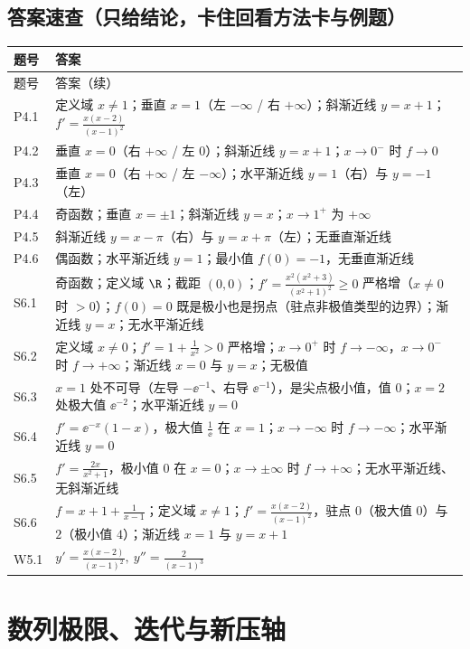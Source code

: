 \documentclass[11pt,a4paper]{ctexart}
\begin{document}
\subsection{答案速查（只给结论，卡住回看方法卡与例题）}
{\footnotesize
\begin{longtable}{@{}p{1.6cm}p{13.0cm}@{}}
\toprule 题号 & 答案 \\ \midrule
\endfirsthead
\toprule 题号 & 答案（续） \\ \midrule
\endhead
\midrule
\endfoot
\bottomrule
\endlastfoot
P4.1 & 定义域 $x\neq1$；垂直 $x=1$（左 $-\infty$ / 右 $+\infty$）；斜渐近线 $y=x+1$；$f'=\frac{x(x-2)}{(x-1)^{2}}$ \\
P4.2 & 垂直 $x=0$（右 $+\infty$ / 左 $0$）；斜渐近线 $y=x+1$；$x\to0^{-}$ 时 $f\to 0$ \\
P4.3 & 垂直 $x=0$（右 $+\infty$ / 左 $-\infty$）；水平渐近线 $y=1$（右）与 $y=-1$（左） \\
P4.4 & 奇函数；垂直 $x=\pm1$；斜渐近线 $y=x$；$x\to1^{+}$ 为 $+\infty$ \\
P4.5 & 斜渐近线 $y=x-\pi$（右）与 $y=x+\pi$（左）；无垂直渐近线 \\
P4.6 & 偶函数；水平渐近线 $y=1$；最小值 $f(0)=-1$，无垂直渐近线 \\
S6.1 & 奇函数；定义域 $\R$；截距 $(0,0)$；$f'=\frac{x^{2}(x^{2}+3)}{(x^{2}+1)^{2}}\geq0$ 严格增（$x\neq0$ 时 $>0$）；$f(0)=0$ 既是极小也是拐点（驻点非极值类型的边界）；渐近线 $y=x$；无水平渐近线 \\
S6.2 & 定义域 $x\neq0$；$f'=1+\frac1{x^{2}}>0$ 严格增；$x\to0^{+}$ 时 $f\to-\infty$，$x\to0^{-}$ 时 $f\to+\infty$；渐近线 $x=0$ 与 $y=x$；无极值 \\
S6.3 & $x=1$ 处不可导（左导 $-\ee^{-1}$、右导 $\ee^{-1}$），是尖点极小值，值 $0$；$x=2$ 处极大值 $\ee^{-2}$；水平渐近线 $y=0$ \\
S6.4 & $f'=\ee^{-x}(1-x)$，极大值 $\frac1\ee$ 在 $x=1$；$x\to-\infty$ 时 $f\to-\infty$；水平渐近线 $y=0$ \\
S6.5 & $f'=\frac{2x}{x^{2}+1}$，极小值 $0$ 在 $x=0$；$x\to\pm\infty$ 时 $f\to+\infty$；无水平渐近线、无斜渐近线 \\
S6.6 & $f=x+1+\frac1{x-1}$；定义域 $x\neq1$；$f'=\frac{x(x-2)}{(x-1)^{2}}$，驻点 $0$（极大值 $0$）与 $2$（极小值 $4$）；渐近线 $x=1$ 与 $y=x+1$ \\
W5.1 & $y'=\frac{x(x-2)}{(x-1)^2},\ y''=\frac2{(x-1)^3}$
\end{longtable}}

\bigskip
\section{数列极限、迭代与新压轴}
\end{document}
